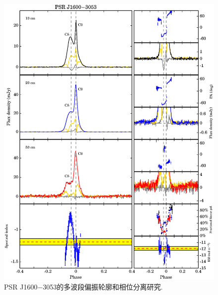 \begin{figure}
\begin{center}
\includegraphics[width=6 in]{1600.ps}
\caption{PSR J1600$-$3053的多波段偏振轮廓和相位分离研究.}
\label{1600}
\end{center}
\end{figure}

